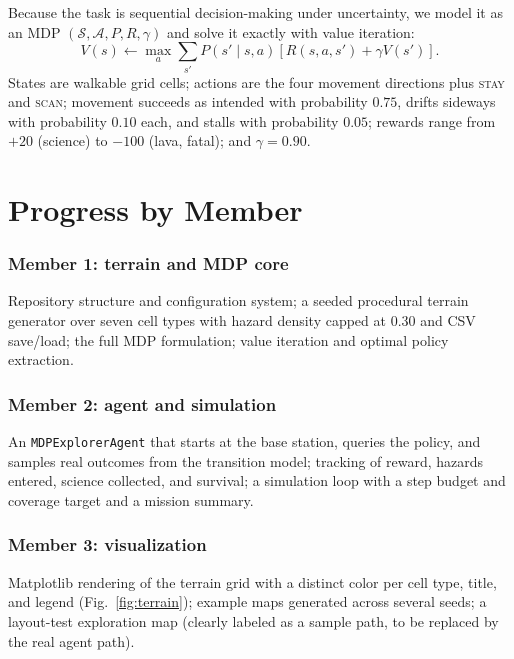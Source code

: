 \documentclass[conference]{IEEEtran}
\begin{document}
Because the task is sequential decision-making under uncertainty, we model it as an MDP $(\mathcal{S}, \mathcal{A}, P, R, \gamma)$ and solve it exactly with value iteration:
\begin{equation}
  V(s) \leftarrow \max_{a} \sum_{s'} P(s' \mid s, a)\left[ R(s, a, s') + \gamma V(s') \right].
\end{equation}
States are walkable grid cells; actions are the four movement directions plus \textsc{stay} and \textsc{scan}; movement succeeds as intended with probability $0.75$, drifts sideways with probability $0.10$ each, and stalls with probability $0.05$; rewards range from $+20$ (science) to $-100$ (lava, fatal); and $\gamma = 0.90$.
\section{Progress by Member}
\subsubsection{Member 1: terrain and MDP core} Repository structure and configuration system; a seeded procedural terrain generator over seven cell types with hazard density capped at $0.30$ and CSV save/load; the full MDP formulation; value iteration and optimal policy extraction.

\subsubsection{Member 2: agent and simulation} An \texttt{MDPExplorerAgent} that starts at the base station, queries the policy, and samples real outcomes from the transition model; tracking of reward, hazards entered, science collected, and survival; a simulation loop with a step budget and coverage target and a mission summary.
\subsubsection{Member 3: visualization} Matplotlib rendering of the terrain grid with a distinct color per cell type, title, and legend (Fig.~\ref{fig:terrain}); example maps generated across several seeds; a layout-test exploration map (clearly labeled as a sample path, to be replaced by the real agent path).
\end{document}
